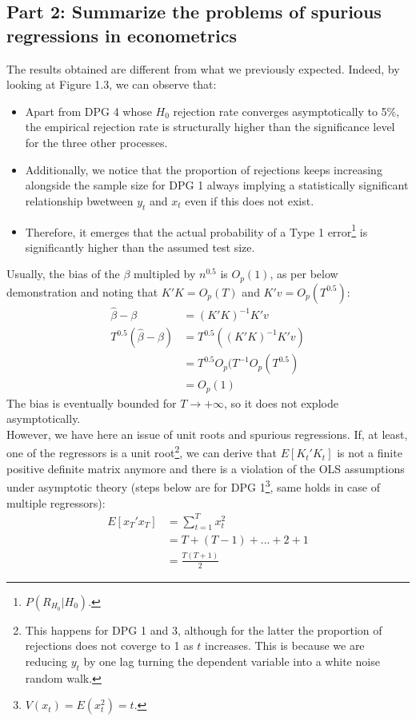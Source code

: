 \documentclass[12pt]{article}
\begin{document}
	\subsection{Part 2: Summarize the problems of spurious regressions in econometrics}
	The results obtained are different from what we previously expected. Indeed, by looking at Figure 1.3, we can observe that:
	\begin{itemize}
		\item Apart from DPG 4 whose $H_0$ rejection rate converges asymptotically to 5\%, the empirical rejection rate is structurally higher than the significance level for the three other processes.
		\item Additionally, we notice that the proportion of rejections keeps increasing alongside the sample size for DPG 1 always implying a statistically significant relationship bwetween $y_t$ and $x_t$ even if this does not exist.
		\item Therefore, it emerges that the actual probability of a Type 1 error\footnote{$P(R_{H_0}|H_0)$.} is significantly higher than the assumed test size.
	\end{itemize}
	Usually, the bias of the $\beta$ multipled by $n^{0.5}$ is $O_{p}(1)$, as per below demonstration and noting that $K'K = O_{p}(T)$ and $K'v = O_{p}(T^{0.5})$:
	\begin{align*}
	\hat{\beta} - \beta &= (K'K)^{-1}K'v \\
	T^{0.5}(\hat{\beta} - \beta) &= T^{0.5}((K'K)^{-1}K'v) \\
	&= T^{0.5}O_{p}(T^{-1}O_{p}(T^{0.5}) \\
	&= O_{p}(1)  
	\end{align*}
	The bias is eventually bounded for $T \to +\infty$, so it does not explode asymptotically.\\ 
	However, we have here an issue of unit roots and spurious regressions. If, at least, one of the regressors is a unit root\footnote{This happens for DPG 1 and 3, although for the latter the proportion of rejections does not coverge to 1 as $t$ increases. This is because we are reducing $y_t$ by one lag turning the dependent variable into a white noise random walk.}, we can derive that $E[K_{t}'K_{t}]$ is not a finite positive definite matrix anymore and there is a violation of the OLS assumptions under asymptotic theory (steps below are for DPG 1\footnote{$V(x_t) = E(x_{t}^2) = t$.}, same holds in case of multiple regressors):
	\begin{align*}
	E[x_{T}'x_{T}] &= \sum_{t=1}^{T}x_{t}^2 \\  
	&= T + (T-1) +...+2+1 \\
	&= \frac{T(T+1)}{2}
	\end{align*}
\end{document}
